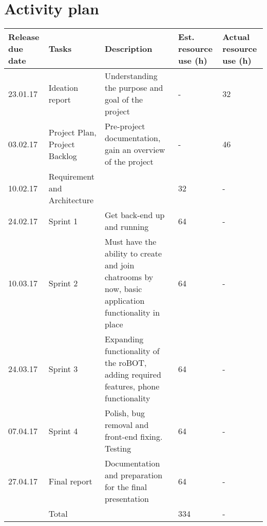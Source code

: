 \section{Activity plan}
\label{app:Activity plan}
\begin{adjustbox}{center}
\begin{tabular}{ p{0.1\paperwidth} | p{0.1\paperwidth} | p{} | p{0.1\paperwidth} | p{0.1\paperwidth} }
    Release due date 
    & Tasks 
    & Description
    & Est. resource use (h)
    & Actual resource use (h)\\ \hline
    23.01.17 
    & Ideation report
    & Understanding the purpose and goal of the project
    & -
    & 32 \\ \hline
    03.02.17
    & Project Plan, Project Backlog
    & Pre-project documentation, gain an overview of the project
    & - 
    & 46 \\ \hline
    10.02.17
    & Requirement and Architecture
    & 
    & 32 
    & - \\ \hline
    24.02.17
    & Sprint 1
    & Get back-end up and running
    & 64 
    & - \\ \hline
    10.03.17
    & Sprint 2
    & Must have the ability to create and join chatrooms by now, basic application functionality in place
    & 64 
    & - \\ \hline
    24.03.17
    & Sprint 3
    & Expanding functionality of the roBOT, adding required features, phone functionality
    & 64
    & - \\ \hline
    07.04.17
    & Sprint 4
    & Polish, bug removal and front-end fixing. Testing
    & 64
    & - \\ \hline
    27.04.17
    & Final report
    & Documentation and preparation for the final presentation
    & 64
    & - \\ \hline
    & Total
    & 
    & 334
    & -
\end{tabular}
\end{adjustbox}

\newpage
